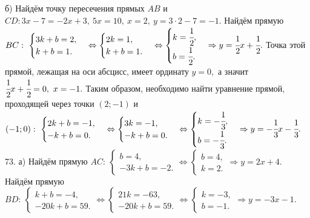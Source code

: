 \documentclass[12pt]{article}
\begin{document}
б) Найдём точку пересечения прямых $AB$ и $CD: 3x-7=-2x+3,\ 5x=10,\ x=2,\ y=3\cdot2-7=-1.$ Найдём прямую $BC:\ \begin{cases} 3k+b=2,\\ k+b=1.\end{cases}\Leftrightarrow\begin{cases} 2k=1,\\ k+b=1.\end{cases}\Leftrightarrow\begin{cases} k=\cfrac{1}{2},\\ b=\cfrac{1}{2}.\end{cases}\Rightarrow y=\cfrac{1}{2}x+\cfrac{1}{2}.$ Точка этой прямой, лежащая на оси абсцисс, имеет ординату $y=0,$ а значит $\cfrac{1}{2}x+\cfrac{1}{2}=0,\ x=-1.$ Таким образом, необходимо найти уравнение прямой, проходящей через точки $(2;-1)$ и $(-1;0): \ \begin{cases} 2k+b=-1,\\ -k+b=0.\end{cases}\Leftrightarrow\begin{cases} 3k=-1,\\ -k+b=0.\end{cases}\Leftrightarrow\begin{cases} k=-\cfrac{1}{3},\\ b=-\cfrac{1}{3}.\end{cases}\Rightarrow y=-\cfrac{1}{3}x-\cfrac{1}{3}.$\\
73. а) Найдём прямую $AC:\ \begin{cases} b=4,\\ -3k+b=-2.\end{cases}\Leftrightarrow\begin{cases} b=4,\\ k=2.\end{cases}\Rightarrow y=2x+4.$
Найдём прямую $BD:\ \begin{cases} k+b=-4,\\ -20k+b=59.\end{cases}\Leftrightarrow\begin{cases} 21k=-63,\\ -20k+b=59.\end{cases}
\Leftrightarrow\begin{cases} k=-3,\\ b=-1.\end{cases}\Rightarrow y=-3x-1.$\\
\end{document}
